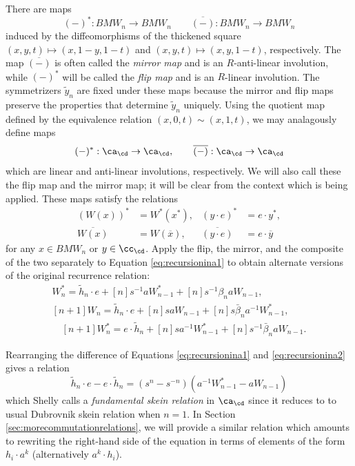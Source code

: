 There are maps
\[
	(-)^*: BMW_n \to BMW_n \qquad \overline{(-)}: BMW_n \to BMW_n
\]
induced by the diffeomorphisms of the thickened square $(x, y, t) \mapsto (x, 1-y, 1-t)$ and $(x, y, t) \mapsto (x, y, 1-t)$, respectively. The map $\overline{(-)}$ is often called the \emph{mirror map} and is an $R$-anti-linear involution, while $(-)^*$ will be called the \emph{flip map} and is an $R$-linear involution. The symmetrizers $\tilde{y}_n$ are fixed under these maps because the mirror and flip maps preserve the properties that determine $\tilde{y}_n$ uniquely.
Using the quotient map defined by the equivalence relation $(x, 0, t) \sim (x, 1, t)$, we may analagously define maps
\[
	(-)^*: \ca_\cd \to \ca_\cd, \qquad \overline{(-)}: \ca_\cd \to \ca_\cd
\]
which are linear and anti-linear involutions, respectively. We will also call these the flip map and the mirror map; it will be clear from the context which is being applied. These maps satisfy the relations
\begin{align*}
	\left( W \left( x \right) \right)^* &= W^* \left( x^* \right), & (y \cdot e)^* &= e \cdot y^*, \\
	\overline{W \left( x \right)} &= W \left( \overline{x} \right), & \overline{(y \cdot e)} &= e \cdot \overline{y}
\end{align*}
for any $x \in BMW_n$ or $y \in \cc_\cd$. Apply the flip, the mirror, and the composite of the two separately to Equation \eqref{eq:recursionina1} to obtain alternate versions of the original recurrence relation:
\begin{align} 
[n+1] W^*_n = \tilde{h}_n \cdot e + [n] s^{-1} a W^*_{n-1} + [n] s^{-1} \beta_n a W_{n-1} \label{eq:recursionina2}, \\
[n+1] W_n = \tilde{h}_n \cdot e + [n] s a W_{n-1} + [n] s \bar{\beta}_n a^{-1} W^*_{n-1} \label{eq:recursionina3}, \\
\quad [n+1] W^*_n = e \cdot \tilde{h}_n + [n] s a^{-1} W^*_{n-1} + [n] s^{-1} \bar{\beta}_n a W_{n-1}. \label{eq:recursionina4}
\end{align}

Rearranging the difference of Equations \eqref{eq:recursionina1} and \eqref{eq:recursionina2} gives a relation
\begin{equation} \label{eq:annfund}
\tilde{h}_n \cdot e - e \cdot \tilde{h}_n = (s^n - s^{-n}) (a^{-1} W^*_{n-1} - a W_{n-1})
\end{equation}
which Shelly calls a \textit{fundamental skein relation} in $\ca_\cd$ since it reduces to to usual Dubrovnik skein relation when $n=1$. In Section \ref{sec:morecommutationrelations}, we will provide a similar relation which amounts to rewriting the right-hand side of the equation in terms of elements of the form $h_i \cdot a^k$ (alternatively $a^k \cdot h_i$). 




